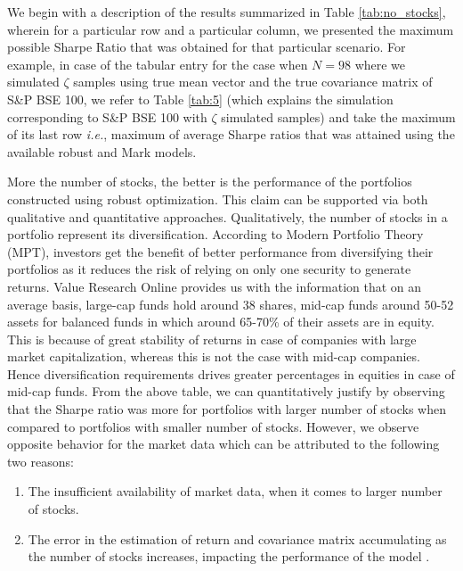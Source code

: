 We begin with a description of the results summarized in Table \ref{tab:no_stocks}, wherein for a particular row and a particular column, we presented the maximum possible Sharpe Ratio that was obtained for that particular scenario. For example, in case of the tabular entry for the case when $N=98$ where we simulated $\zeta$ samples using true mean vector and the true covariance matrix of S\&P BSE 100, we refer to Table \ref{tab:5} (which explains the simulation corresponding to S\&P BSE 100 with $\zeta$ simulated samples) and take the maximum of its last row \textit{i.e.}, maximum of average Sharpe ratios that was attained using the available robust and Mark models. 

More the number of stocks, the better is the performance of the portfolios constructed using robust optimization. This claim can be supported via both qualitative and quantitative approaches. Qualitatively, the number of stocks in a portfolio represent its diversification. According to Modern Portfolio Theory (MPT), investors get the benefit of better performance from diversifying their portfolios as it reduces the risk of relying on only one security to generate returns. Value Research Online \cite{vro} provides us with the information that on an average basis, large-cap funds hold around 38 shares, mid-cap funds around 50-52 assets for balanced funds in which around 65-70\% of their assets are in equity. This is because of great stability of returns in case of companies with large market capitalization, whereas this is not the case with mid-cap companies. Hence diversification requirements drives greater percentages in equities in case of mid-cap funds. From the above table, we can quantitatively justify by observing that the Sharpe ratio was more for portfolios with larger number of stocks when compared to portfolios with smaller number of stocks. However, we observe opposite behavior for the market data which can be attributed to the following two reasons:
\begin{enumerate}
\item The insufficient availability of market data, when it comes to larger number of stocks.
\item The error in the estimation of return and covariance matrix accumulating as the number of stocks increases, impacting the performance of the model \cite{Michaud}.
\end{enumerate}



